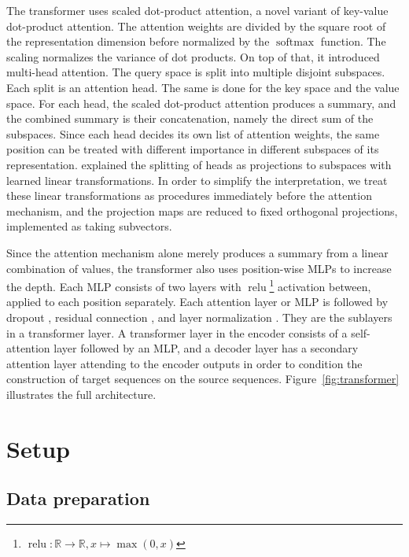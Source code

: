 \documentclass[11pt,twocolumn]{article}
\DeclareMathOperator{\softmax}{softmax}
\DeclareMathOperator{\relu}{relu}
\begin{document}
The transformer uses scaled dot-product attention,
a novel variant of key-value dot-product attention.
The attention weights are divided by the square root of the representation dimension
before normalized by the \(\softmax\) function.
The scaling normalizes the variance of dot products.
On top of that, it introduced multi-head attention.
The query space is split into multiple disjoint subspaces.
Each split is an attention head.
The same is done for the key space and the value space.
For each head, the scaled dot-product attention produces a summary,
and the combined summary is their concatenation,
namely the direct sum of the subspaces.
Since each head decides its own list of attention weights,
the same position can be treated with different importance in different subspaces of its representation.
\textcite{vaswani2017attention} explained the splitting of heads
as projections to subspaces with learned linear transformations.
In order to simplify the interpretation,
we treat these linear transformations as procedures immediately before the attention mechanism,
and the projection maps are reduced to fixed orthogonal projections,
implemented as taking subvectors.

Since the attention mechanism alone merely produces a summary from a linear combination of values,
the transformer also uses position-wise MLPs to increase the depth.
Each MLP consists of two layers with
\(\relu\)\footnote{\(\relu : \mathbb{R} \to \mathbb{R}, x \mapsto \max(0, x)\)} activation between,
applied to each position separately.
Each attention layer or MLP is followed by dropout \parencite{srivastava2014dropout},
residual connection \parencite{he2016deep}, and layer normalization \parencite{ba2016layer}.
They are the sublayers in a transformer layer.
A transformer layer in the encoder consists of a self-attention layer followed by an MLP,
and a decoder layer has a secondary attention layer attending to the encoder outputs
in order to condition the construction of target sequences on the source sequences.
Figure~\ref{fig:transformer} illustrates the full architecture.

\section{Setup}%
\label{sec:setup}

\subsection{Data preparation}
\label{ssec:data}
\end{document}
